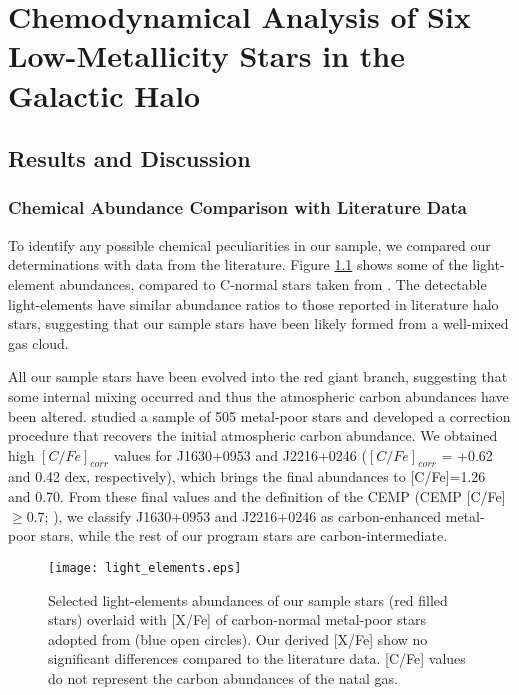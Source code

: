 \chapter{Chemodynamical Analysis of Six Low-Metallicity Stars in the Galactic Halo}\label{chap:introduction}




\section{Results and Discussion}\label{sec:discussions}
  
\subsection{Chemical Abundance Comparison with Literature Data}
 

To identify any possible chemical peculiarities in our sample, we compared our
determinations with data from the literature. Figure \ref{fig:abund} shows some
of the light-element abundances, compared to C-normal stars taken from
\citet{2013ApJ...762...26Y}. The detectable light-elements have similar
abundance ratios to those reported in literature halo stars, suggesting that our
sample stars have been likely formed from a well-mixed gas cloud.

All our sample stars have been evolved into the red giant branch, suggesting that some internal mixing occurred and thus the
atmospheric carbon abundances have been altered.  \citet{2014ApJ...797...21P}
studied a sample of 505 metal-poor stars and developed a correction procedure that
recovers the initial atmospheric carbon abundance.  We obtained high $[C/Fe]_{corr}$ values
for J1630+0953 and J2216+0246 ($[C/Fe]_{corr}$ = +0.62 and 0.42 dex,
respectively), which brings the final abundances to [C/Fe]=1.26 and
0.70. From these final values and the definition of the CEMP
(CEMP [C/Fe] $\geq 0.7$; \citealt{2007ApJ...655..492A}), we classify J1630+0953 and J2216+0246 as
carbon-enhanced metal-poor stars, while the rest of our program stars are
carbon-intermediate.

\begin{figure}[!ht]
\centering
\texttt{[image: light\_elements.eps]} 
\caption{Selected light-elements abundances of our sample stars (red filled
stars) overlaid with [X/Fe] of carbon-normal metal-poor stars adopted
from \citet{2013ApJ...762...26Y} (blue open circles). Our derived [X/Fe]
show no significant differences compared to the literature data. [C/Fe]
values do not represent the carbon abundances of the natal gas.}
\label{fig:abund}
\end{figure}



